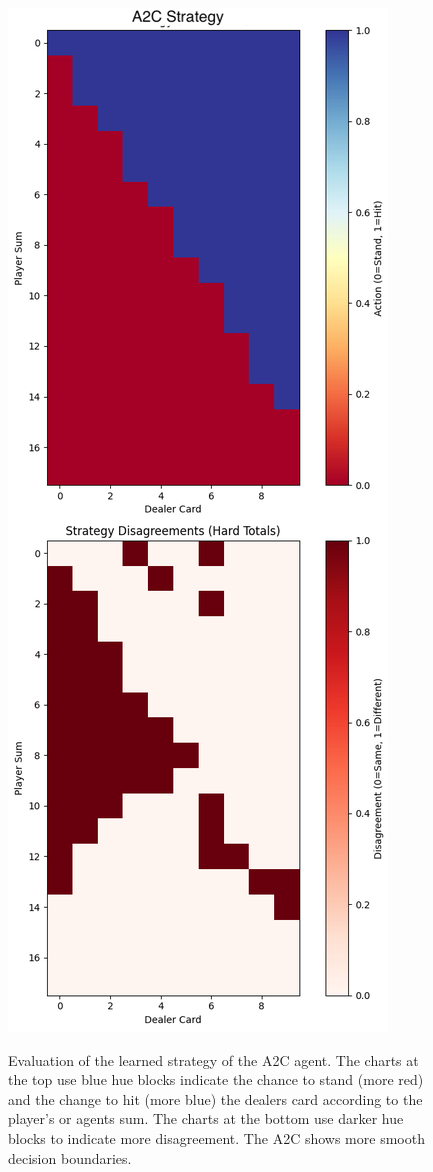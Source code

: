 \documentclass[compsoc]{IEEEtran}
\begin{document}
{\begin{figure}[h]
\centering
{\includegraphics[scale=0.3]{./fig/q2c_vs_ddqn_strategy_map_a2c.png}}
\caption{Evaluation of the learned strategy of the A2C agent. The charts at the top use blue hue blocks indicate the chance to stand (more red) and the change to hit (more blue) the dealers card according to the player's or agents sum. The charts at the bottom use darker hue blocks to indicate more disagreement. The A2C shows more smooth decision boundaries.}
\end{figure}

}
\end{document}
